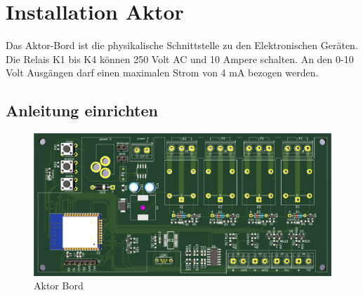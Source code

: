 \clearpage
\section{Installation Aktor}\label{sec:Aktor}
Das Aktor-Bord ist die physikalische Schnittstelle zu den Elektronischen Geräten. Die Relais K1 bis K4 können 250 Volt AC und 10 Ampere schalten. An den 0-10 Volt Ausgängen darf einen maximalen Strom von 4 mA bezogen werden.
\subsection{Anleitung einrichten}
\begin{figure}[H]
	\centering
	\includegraphics[width=\textwidth]{graphics/Aktorbaustein.png}
	\caption{Aktor Bord} 	
	\label{pic: OSGILayers}
\end{figure} 

